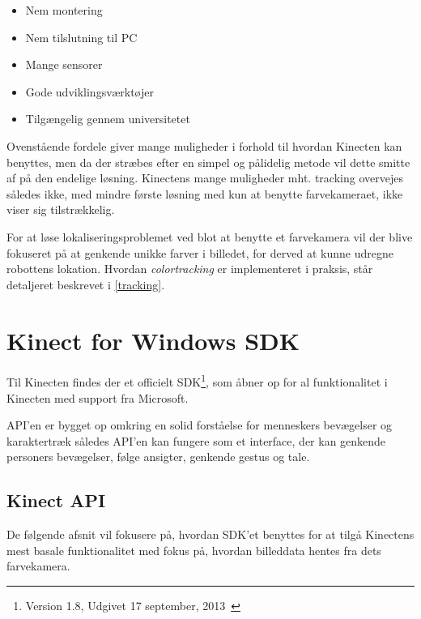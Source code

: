 \begin{itemize}
\item Nem montering
\item Nem tilslutning til PC
\item Mange sensorer
\item Gode udviklingsværktøjer
\item Tilgængelig gennem universitetet
\end{itemize}


Ovenstående fordele giver mange muligheder i forhold til hvordan Kinecten kan benyttes, men da der stræbes efter en simpel og pålidelig metode vil dette smitte af på den endelige løsning.
Kinectens mange muligheder mht. tracking overvejes således ikke, med mindre første løsning med kun at benytte farvekameraet, ikke viser sig tilstrækkelig.

For at løse lokaliseringsproblemet ved blot at benytte et farvekamera vil der blive fokuseret på at genkende unikke farver i billedet, for derved at kunne udregne robottens lokation.
Hvordan \textit{colortracking} er implementeret i praksis, står detaljeret beskrevet i \cref{tracking}.


\section{Kinect for Windows SDK}
Til Kinecten findes der et officielt SDK\footnote{ Version 1.8, Udgivet 17 september, 2013~\cite{kinectSDK18}}, som åbner op for al funktionalitet i Kinecten med support fra Microsoft.

API'en er bygget op omkring en solid forståelse for menneskers bevægelser og karaktertræk således API'en kan fungere som et interface, der kan genkende personers bevægelser, følge ansigter, genkende gestus og tale.

\subsection{Kinect API}\label{kinect:kinectapi}
De følgende afsnit vil fokusere på, hvordan SDK'et benyttes for at tilgå Kinectens mest basale funktionalitet med fokus på, hvordan billeddata hentes fra dets farvekamera.

